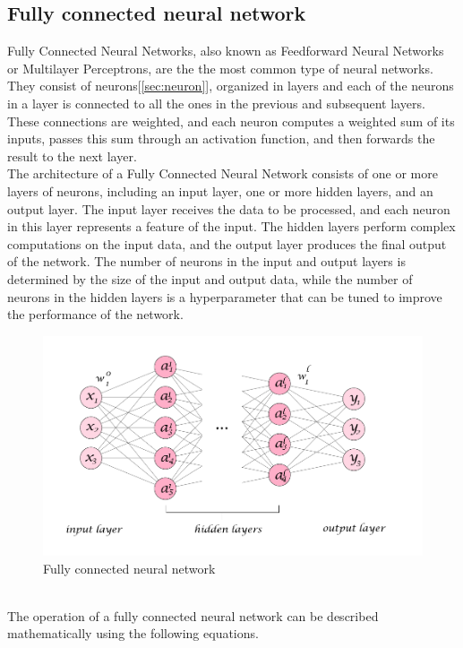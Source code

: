 \documentclass[a4paper]{sapthesis}
\begin{document}
\subsection{Fully connected neural network}
Fully Connected Neural Networks, also known as Feedforward Neural Networks
or Multilayer Perceptrons, are the the most common type of neural networks.
They consist of neurons[\ref{sec:neuron}], organized in layers and each of
 the neurons in a layer
 is connected to all the ones in the previous and subsequent layers. 
These connections are weighted, and each neuron computes a weighted sum of its inputs, passes
  this sum through an activation function, and then forwards the result to
 the next layer.\newline \\
The architecture of a Fully Connected Neural Network consists of one or
 more layers of neurons, including an input layer, one or more hidden 
 layers, and an output layer. The input layer receives the data to be
  processed, and each neuron in this layer represents a feature of the 
  input. The hidden layers perform complex computations on the input data,
and the output layer produces the final output of the network. The 
number of neurons in the input and output layers is determined by the
size of the input and output data, while the number of neurons in the
hidden layers is a hyperparameter that can be tuned to improve the
performance of the network.
\begin{figure}[h]
\includegraphics[scale=0.5]{fully_connected_nn}
\centering
\caption{Fully connected neural network}\label{fig:fully_connected}

\end{figure}\newline \\
The operation of a fully connected neural network can be described 
mathematically using the following equations.
\end{document}
